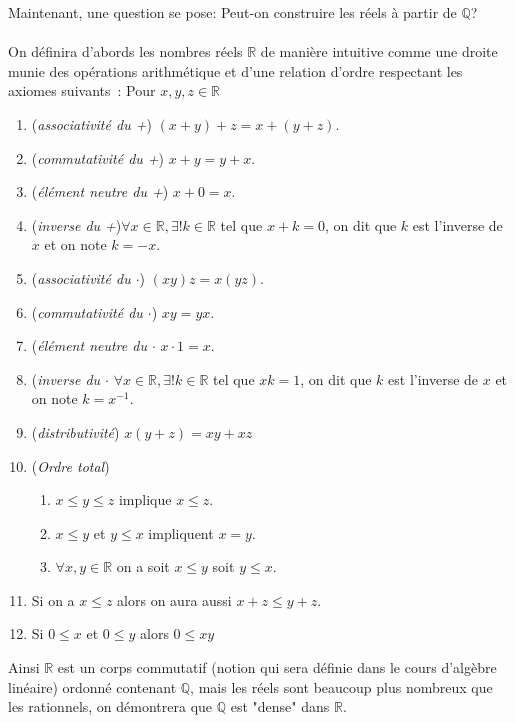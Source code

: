 \documentclass[a4paper, 12pt, french, twoside]{article}
\newcommand{\Rr}{{\mathbb{R}}}
\newcommand{\Qq}{{\mathbb{Q}}}
\begin{document}
\begin{tcolorbox}
Maintenant, une question se pose: Peut-on construire les réels à partir de $\Qq$? \\\\
On définira d'abords les nombres réels $\Rr$ de manière intuitive comme une droite munie des opérations arithmétique et d'une relation d'ordre respectant les axiomes suivants : Pour $x,y,z\in \Rr$
    \begin{enumerate}
        \item (\textit{associativité du +}) $(x+y)+z=x+(y+z)$.
        \item (\textit{commutativité du +}) $x+y=y+x$.
        \item (\textit{élément neutre du +}) $x+0=x$.
        \item (\textit{inverse du +})$\forall x\in \Rr , \exists ! k \in \Rr$ tel que $x+k=0$, on dit que $k$ est l'inverse de $x$ et on note $k=-x$.
        \item (\textit{associativité du $\cdot$}) $(xy)z=x(yz)$.
        \item (\textit{commutativité du $\cdot$}) $xy=yx$.
        \item (\textit{élément neutre du $\cdot$} $x\cdot 1=x$.
        \item (\textit{inverse du $\cdot$} $\forall x\in \Rr , \exists ! k \in \Rr$ tel que $xk=1$, on dit que $k$ est l'inverse de $x$ et on note $k=x^{-1}$.
        \item (\textit{distributivité}) $x(y+z)=xy+xz$
        \item (\textit{Ordre total}) 
        \begin{enumerate}
            \item $x\leq y \leq z$ implique $x\leq z $.
            \item $x\leq y$ et $y\leq x$ impliquent $x=y$.  
            \item $\forall x,y \in \Rr$ on a soit $x\leq y$ soit $y\leq x$. 
        \end{enumerate}
        \item Si on a $x\leq z$ alors on aura aussi $x+z\leq y+z$.
        \item Si $0\leq x$ et $0\leq y$ alors $0\leq xy$
        \end{enumerate}
Ainsi $\Rr$ est un corps commutatif (notion qui sera définie dans le cours d'algèbre linéaire) ordonné contenant $\Qq$, mais les réels sont beaucoup plus nombreux que les rationnels, on démontrera que $\Qq$ est "dense" dans $\Rr$. 
\end{tcolorbox}
\end{document}
